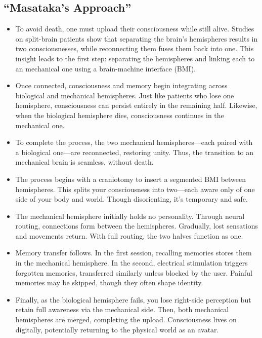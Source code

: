 \documentclass[10pt]{article}
\begin{document}
\begin{sloppypar}
  \subsection{“Masataka’s Approach”}
  \label{sec:masataka-approach}

  \begin{itemize}
    \item To avoid death, one must upload their consciousness while still alive. Studies on split-brain patients show that separating the brain’s hemispheres results in two consciousnesses, while reconnecting them fuses them back into one. This insight leads to the first step: separating the hemispheres and linking each to an mechanical one using a brain-machine interface (BMI).
    \item Once connected, consciousness and memory begin integrating across biological and mechanical hemispheres. Just like patients who lose one hemisphere, consciousness can persist entirely in the remaining half. Likewise, when the biological hemisphere dies, consciousness continues in the mechanical one.
    \item To complete the process, the two mechanical hemispheres—each paired with a biological one—are reconnected, restoring unity. Thus, the transition to an mechanical brain is seamless, without death.
    \item The process begins with a craniotomy to insert a segmented BMI between hemispheres. This splits your consciousness into two—each aware only of one side of your body and world. Though disorienting, it’s temporary and safe.
    \item The mechanical hemisphere initially holds no personality. Through neural routing, connections form between the hemispheres. Gradually, lost sensations and movements return. With full routing, the two halves function as one.
    \item Memory transfer follows. In the first session, recalling memories stores them in the mechanical hemisphere. In the second, electrical stimulation triggers forgotten memories, transferred similarly unless blocked by the user. Painful memories may be skipped, though they often shape identity.
    \item Finally, as the biological hemisphere fails, you lose right-side perception but retain full awareness via the mechanical side. Then, both mechanical hemispheres are merged, completing the upload. Consciousness lives on digitally, potentially returning to the physical world as an avatar.

\end{itemize}
\end{sloppypar}
\end{document}
